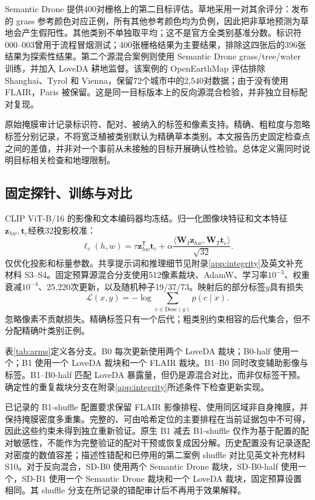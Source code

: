 Semantic Drone 提供400对栅格上的第二目标评估\citep{tugraz2018semanticdrone}。草地采用一对其余评分：发布的 grass 参考颜色对应正例，所有其他参考颜色均为负例，因此把非草地预测为草地会产生假阳性。其他类别不单独取平均；这不是官方全类别基准分数。标识符000--003曾用于流程冒烟测试；400张栅格结果为主要结果，排除这四张后的396张结果为探索性结果。第二个源混合案例则使用 Semantic Drone grass/tree/water 训练，并加入 LoveDA 耕地监督。该案例的 OpenEarthMap 评估排除 Shanghai、Tyrol 和 Vienna，保留72个城市中的2,540对数据；由于没有使用 FLAIR，Paris 被保留。这是同一目标版本上的反向源混合检验，并非独立目标配对复现。

原始掩膜审计记录标识符、配对、被纳入的标签和像素支持。精确、粗粒度与忽略标签分别记录，不将宽泛植被类别默认为精确草本类别。本文报告历史固定检查点之间的差值，并非对一个事前从未接触的目标开展确认性检验。总体定义需同时说明目标相关检查和地理限制。

\subsection{固定探针、训练与对比}
\label{sec:probe}
CLIP ViT-B/16 的影像和文本编码器均冻结\citep{radford2021clip}。归一化图像块特征和文本特征\(\mathbf z_{hw},\mathbf t_c\)经秩32投影校准：
\begin{equation}
\ell_c(h,w)=\tau\mathbf z_{hw}^{\mathsf T}\mathbf t_c+
\alpha\frac{\langle\mathbf W_I\mathbf z_{hw},\mathbf W_T\mathbf t_c\rangle}{\sqrt{32}}.
\label{eq:adapter}
\end{equation}
仅优化投影和标量参数。共享提示词和推理细节见附录\ref{app:integrity}及英文补充材料 S3--S4。固定预算源混合分支使用512像素裁块、AdamW、学习率\(10^{-3}\)、权重衰减\(10^{-4}\)、25,220次更新，以及随机种子19/37/73。映射后的部分标签\(y\)具有损失
\begin{equation}
\mathcal L(x,y)=-\log\sum_{c\in\mathrm{Desc}(y)}p(c\mid x).
\label{eq:partial_loss}
\end{equation}
忽略像素不贡献损失。精确标签只有一个后代；粗类别约束相容的后代集合，但不分配精确叶类别正例。

表\ref{tab:arms}定义各分支。B0 每次更新使用两个 LoveDA 裁块；B0-half 使用一个；B1 使用一个 LoveDA 裁块和一个 FLAIR 裁块。B1--B0 同时改变辅助影像与标签。B1--B0-half 匹配 LoveDA 暴露量，但仍是源混合对比，而非仅标签干预。确定性的重复裁块分支在附录\ref{app:integrity}所述条件下检查更新实现。


已记录的 B1-shuffle 配置要求保留 FLAIR 影像排程、使用同区域非自身掩膜，并保持掩膜密度多重集。完整的、可由哈希定位的主要排程在当前证据包中不可得，因此这些约束未得到独立重新验证。原生 B1 减去 B1-shuffle 仅作为基于配置的配对敏感性，不能作为完整验证的配对干预或恢复成因分解。历史配置没有记录逐配对密度的数值容差；描述性错配和已停用的第二案例 shuffle 对比见英文补充材料 S10。对于反向混合，SD-B0 使用两个 Semantic Drone 裁块，SD-B0-half 使用一个，SD-B1 使用一个 Semantic Drone 裁块和一个 LoveDA 裁块，固定预算设置相同。其 shuffle 分支在所记录的错配审计后不再用于效果解释。


